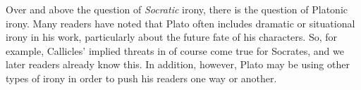 \documentclass[11pt]{article}
\begin{document}
Over and above the question of \emph{Socratic} irony, there is the question
of Platonic irony.  Many readers have noted that Plato often includes
dramatic or situational irony in his work, particularly about the future
fate of his characters.  So, for example, Callicles' implied threats in
 of course come true for Socrates, and we later readers
already know this.  In addition, however, Plato may be using other types of
irony in order to push his readers one way or another.



\newpage


\end{document}
